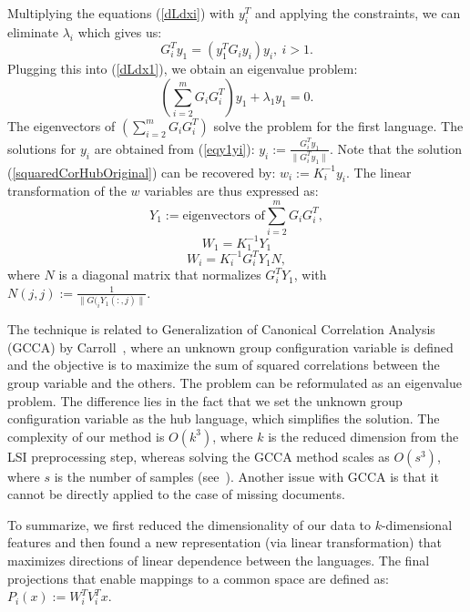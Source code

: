 Multiplying the equations (\ref{dLdxi}) with $y_i^T$ and applying the
constraints, we can eliminate $\lambda_i$ which gives us:
\begin{equation}\label{eqy1yi}
G_{i}^T y_1 = \left(y_1^T G_{i} y_i \right) y_i,~i > 1.
\end{equation}
Plugging this into (\ref{dLdx1}), we obtain an eigenvalue problem:
$$\left( \sum_{i = 2}^m G_i G_{i}^T \right) y_1 + \lambda_1 y_1 = 0.$$
The eigenvectors of $\left( \sum_{i = 2}^m G_i G_{i}^T \right)$ solve
the problem for the first language. The solutions for $y_i$ are obtained
from (\ref{eqy1yi}): $y_i := \frac{G_{i}^T y_1}{\| G_{i}^T y_1 \|}$.
Note that the solution (\ref{squaredCorHubOriginal}) can be recovered
by: $w_i := K_i^{-1} y_i$. The linear transformation of the $w$
variables are thus expressed as:
$$ Y_1 := \text{eigenvectors of} \sum_{i = 2}^m G_i G_{i}^T, $$
$$ W_1 = K_1^{-1} Y_1 $$
$$ W_i = K_i^{-1} G_{i}^T Y_1 N,$$
where $N$ is a diagonal matrix that normalizes $G_{i}^T Y_1$, with
$N(j,j) := \frac{1}{\|G(_{i} Y_1(:,j)\|}$.

 The technique is related to  Generalization of Canonical
Correlation Analysis (GCCA) by Carroll~\citeyear{Carroll}, where an unknown
group configuration variable is defined and the objective is to maximize the
sum of squared correlations between the group variable and the others. The
problem can be reformulated as an eigenvalue problem. The difference lies in
the fact that we set the unknown group configuration variable as the hub language,
which simplifies the solution. The complexity of our method is $O(k^3)$, where $k$
is the reduced dimension from the LSI preprocessing step, whereas solving the
GCCA method scales as $O(s^3)$, where $s$ is the number of samples (see~\cite{gifi}).
Another issue with GCCA is that it cannot be directly applied to the case of missing documents.

To summarize, we first reduced the dimensionality of our data to $k$-dimensional
features and then found a new representation (via linear transformation) that
maximizes directions of linear dependence between the languages. The final
projections that enable mappings to a common space are defined as:
$P_i(x) := W_i^T V_i^T x.$

